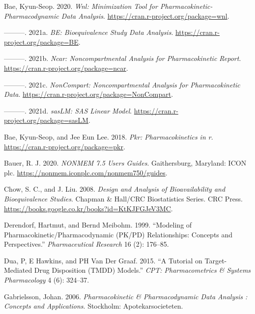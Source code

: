 \documentclass[
  11pt,
  krantz2, a4paper, twoside]{krantz}
\newlength{\cslhangindent}
\newenvironment{CSLReferences}[2] %
 {\begin{list}{}{%
  \setlength{\itemindent}{0pt}
  \setlength{\leftmargin}{0pt}
  \setlength{\parsep}{0pt}
  \ifodd #1
   \setlength{\leftmargin}{\cslhangindent}
   \setlength{\itemindent}{-1\cslhangindent}
  \fi
  \setlength{\itemsep}{#2\baselineskip}}}
 {\end{list}}
\theoremstyle{definition}
\theoremstyle{definition}
\theoremstyle{definition}
\theoremstyle{definition}
\theoremstyle{remark}
\begin{document}
\label{refs}
\begin{CSLReferences}{1}{0}
Bae, Kyun-Seop. 2020. \emph{Wnl: Minimization Tool for Pharmacokinetic-Pharmacodynamic Data Analysis}. \url{https://cran.r-project.org/package=wnl}.

---------. 2021a. \emph{BE: Bioequivalence Study Data Analysis}. \url{https://cran.r-project.org/package=BE}.

---------. 2021b. \emph{Ncar: Noncompartmental Analysis for Pharmacokinetic Report}. \url{https://cran.r-project.org/package=ncar}.

---------. 2021c. \emph{NonCompart: Noncompartmental Analysis for Pharmacokinetic Data}. \url{https://cran.r-project.org/package=NonCompart}.

---------. 2021d. \emph{sasLM: SAS Linear Model}. \url{https://cran.r-project.org/package=sasLM}.

Bae, Kyun-Seop, and Jee Eun Lee. 2018. \emph{Pkr: Pharmacokinetics in r}. \url{https://cran.r-project.org/package=pkr}.

Bauer, R. J. 2020. \emph{NONMEM 7.5 Users Guides}. Gaithersburg, Maryland: ICON plc. \url{https://nonmem.iconplc.com/nonmem750/guides}.

Chow, S. C., and J. Liu. 2008. \emph{Design and Analysis of Bioavailability and Bioequivalence Studies}. Chapman \& Hall/CRC Biostatistics Series. CRC Press. \url{https://books.google.co.kr/books?id=KtKJFGJeV3MC}.

Derendorf, Hartmut, and Bernd Meibohm. 1999. {``Modeling of Pharmacokinetic/Pharmacodynamic (PK/PD) Relationships: Concepts and Perspectives.''} \emph{Pharmaceutical Research} 16 (2): 176--85.

Dua, P, E Hawkins, and PH Van Der Graaf. 2015. {``A Tutorial on Target-Mediated Drug Disposition (TMDD) Models.''} \emph{CPT: Pharmacometrics \& Systems Pharmacology} 4 (6): 324--37.

Gabrielsson, Johan. 2006. \emph{Pharmacokinetic \& Pharmacodynamic Data Analysis : Concepts and Applications}. Stockholm: Apotekarsocieteten.


\end{CSLReferences}
\end{document}
